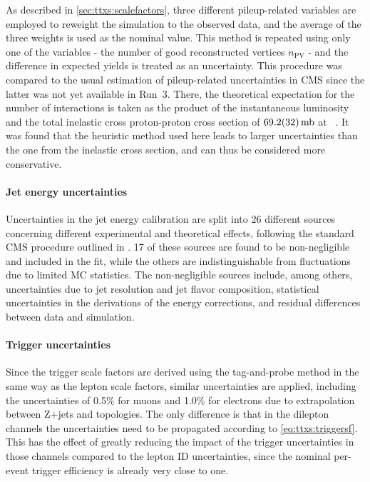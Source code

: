 As described in \cref{sec:ttxs:scalefactors}, three different pileup-related variables are employed to reweight the simulation to the observed data, and the average of the three weights is used as the nominal value. This method is repeated using only one of the variables - the number of good reconstructed vertices $n_{\mathrm{PV}}$ - and the difference in expected yields is treated as an uncertainty. 
This procedure was compared to the usual estimation of pileup-related uncertainties in CMS since the latter was not yet available in Run~3. There, the theoretical expectation for the number of interactions %
is taken as the product of the instantaneous luminosity and the total inelastic cross proton-proton cross section of $\SI{69.2 \pm 3.2}{\milli\barn}$ at \sqrtsRII~\cite{CMS:LUM-17-003}. It was found that the heuristic method used here leads to
larger uncertainties than the one from the inelastic cross section, and can thus be considered more conservative.

\paragraph{Jet energy uncertainties}

Uncertainties in the jet energy calibration are split into 26 different sources concerning different experimental and theoretical effects, following the standard CMS procedure outlined in . 17 of these sources are found to be non-negligible and included in the fit, while the others are indistinguishable from fluctuations due to limited MC statistics. The non-negligible sources include, among others, uncertainties due to jet \pt resolution and jet flavor composition, statistical uncertainties in the derivations of the energy corrections, and residual differences between data and simulation.

\paragraph{Trigger uncertainties}

Since the trigger scale factors are derived using the tag-and-probe method in the same way as the lepton scale factors, similar uncertainties are applied, including the uncertainties of 0.5\% for muons and 1.0\% for electrons due to extrapolation between Z+jets and \ttbar topologies. The only difference is that in the dilepton channels the uncertainties need to be propagated according to \cref{eq:ttxs:triggersf}. This has the effect of greatly reducing the impact of the trigger uncertainties in those channels compared to the lepton ID uncertainties, since the nominal per-event trigger efficiency is already very close to one.

